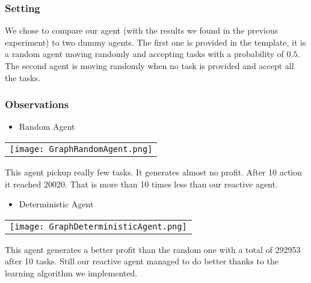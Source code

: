 \documentclass[11pt]{article}
\begin{document}
\subsubsection{Setting}
We chose to compare our agent (with the results we found in the previous experiment) to two dummy agents. The first one is provided in the template, it is a random agent moving randomly and accepting tasks with a probability of $0.5$.
The second agent is moving randomly when no task is provided and accept all the tasks.

\subsubsection{Observations}
\begin{itemize}
\item Random Agent
\end{itemize}
\begin{tabular}{|c|}
\texttt{[image: GraphRandomAgent.png]}
\end{tabular}

This agent pickup really few tasks. It generates almost no profit. After 10 action it reached 20020. That is more than 10 times less than our reactive agent.

\begin{itemize}
\item Deterministic Agent
\end{itemize}
\begin{tabular}{|c|}
\texttt{[image: GraphDeterministicAgent.png]}
\end{tabular}

This agent generates a better profit than the random one with a total of 292953 after 10 tasks. Still our reactive agent managed to do better thanks to the learning algorithm we implemented.
\end{document}
